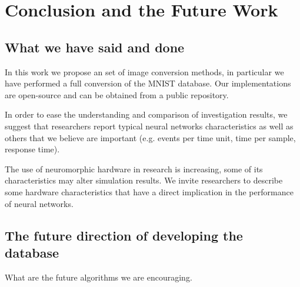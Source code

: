 \section{Conclusion and the Future Work}
\label{sec:summ}
\subsection{What we have said and done}
In this work we propose an set of image conversion methods, in particular we have performed a full conversion of the MNIST database. Our implementations are open-source and can be obtained from a public repository.

In order to ease the understanding and comparison of investigation results, we suggest that researchers report typical neural networks characteristics as well as others that we believe are important (e.g. events per time unit, time per sample, response time).

The use of neuromorphic hardware in research is increasing, some of its characteristics may alter simulation results. We invite researchers to describe some hardware characteristics that have a direct implication in the performance of neural networks.

\subsection{The future direction of developing the database}
What are the future algorithms we are encouraging.

